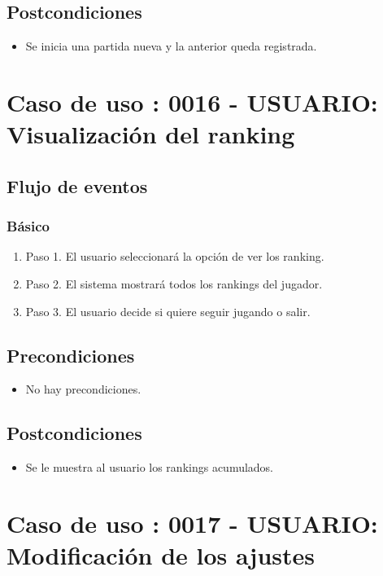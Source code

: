 \subsection{Postcondiciones}
\begin{itemize}
\item Se inicia una partida nueva y la anterior queda registrada. 
\end{itemize}



\section{Caso de uso : 0016 - USUARIO: Visualización del ranking}\label{sec:uc0}
\subsection{Flujo de eventos}
\subsubsection{Básico}

\begin{enumerate}
\item Paso 1.
El usuario seleccionará la opción de ver los ranking. 
\item Paso 2.
El sistema mostrará todos los rankings del jugador.
\item Paso 3.
El usuario decide si quiere seguir jugando o salir.
\end{enumerate}

\subsection{Precondiciones}
\begin{itemize}
\item No hay precondiciones.
\end{itemize}

\subsection{Postcondiciones}
\begin{itemize}
\item Se le muestra al usuario los rankings acumulados. 
\end{itemize}



\section{Caso de uso : 0017 - USUARIO: Modificación de los ajustes}\label{sec:uc0}
